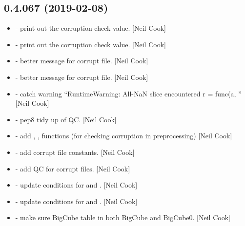 \documentclass[a4paper,10pt,english]{report}
\begin{document}
\subsection{0.4.067 (2019-02-08)}
\label{\detokenize{misc/changelog:id191}}\begin{itemize}
\item {} 
 - print out the corruption check value. {[}Neil
Cook{]}

\item {} 
 - print out the corruption check value. {[}Neil
Cook{]}

\item {} 
 - better message for corrupt file. {[}Neil
Cook{]}

\item {} 
 - better message for corrupt file. {[}Neil
Cook{]}

\item {} 
 - catch warning “RuntimeWarning: All-NaN slice
encountered r = func(a, ” {[}Neil Cook{]}

\item {} 
 - pep8 tidy up of QC. {[}Neil Cook{]}

\item {} 
 - add , ,
 functions (for checking corruption in
preprocessing) {[}Neil Cook{]}

\item {} 
 - add corrupt file constants. {[}Neil Cook{]}

\item {} 
 - add QC for corrupt files. {[}Neil Cook{]}

\item {} 
 - update conditions for  and .
{[}Neil Cook{]}

\item {} 
 - update conditions for  and .
{[}Neil Cook{]}

\item {} 
 - make sure BigCube table in both BigCube and
BigCube0. {[}Neil Cook{]}


\end{itemize}
\end{document}

